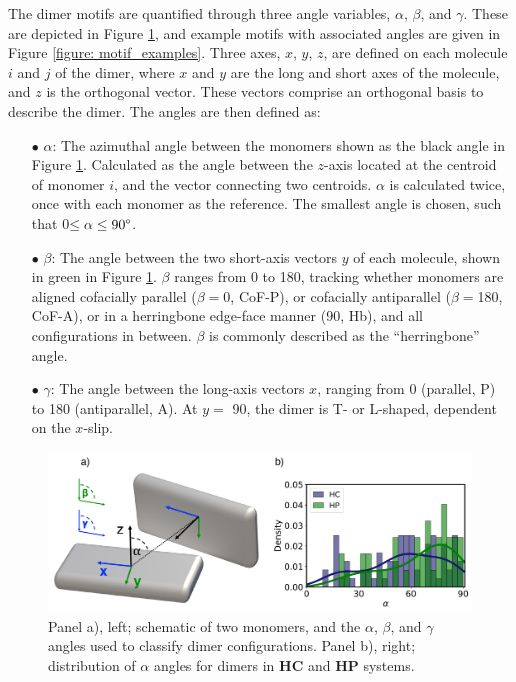 The dimer motifs are quantified through three angle variables, $\alpha$, $\beta$, and $\gamma$. These are depicted in Figure \ref{figure: dimer_schematic_alpha}, and example motifs with associated angles are given in Figure \ref{figure: motif_examples}. Three axes, $x$, $y$, $z$, are defined on each molecule $i$ and $j$ of the dimer, where $x$ and $y$ are the long and short axes of the molecule, and $z$ is the orthogonal vector. These vectors comprise an orthogonal basis to describe the dimer. The angles are then defined as:
\begin{itemize}
\item[$\bullet$] $\alpha$: The azimuthal angle between the monomers shown as the black angle in Figure \ref{figure: dimer_schematic_alpha}. Calculated as the angle between the $z$-axis located at the centroid of monomer $i$, and the vector connecting two centroids. $\alpha$ is calculated twice, once with each monomer as the reference. The smallest angle is chosen, such that 0\degree{}$\leq\alpha\leq{}90\degree{}$.

\item[$\bullet$] $\beta$: The angle between the two short-axis vectors $y$ of each molecule, shown in green in Figure \ref{figure: dimer_schematic_alpha}. $\beta$ ranges from 0\degree{} to 180\degree{}, tracking whether monomers are aligned cofacially parallel ($\beta=$0\degree{}, CoF-P), or cofacially antiparallel ($\beta=$180\degree{}, CoF-A), or in a herringbone edge-face manner (90\degree{}, Hb), and all configurations in between. $\beta$ is commonly described as the ``herringbone'' angle. 

\item[$\bullet$] $\gamma$: The angle between the long-axis vectors $x$, ranging from 0\degree{} (parallel, P) to 180\degree{} (antiparallel, A). At $y=$ 90\degree{}, the dimer is T- or L-shaped, dependent on the $x$-slip. 
\end{itemize}

\begin{figure}[t]
\centering
  \includegraphics[width=0.8\linewidth]{5ConnectingCrystalStructure/dimer_schematic_alpha}
  \caption[Schematic of $\alpha$, $\beta$, and $\gamma$ angles for classification of dimers.]{Panel a), left; schematic of two monomers, and the $\alpha$, $\beta$, and $\gamma$ angles used to classify dimer configurations. Panel b), right; distribution of $\alpha$ angles for dimers in \textbf{HC} and \textbf{HP} systems.}
  \label{figure: dimer_schematic_alpha}
\end{figure}

